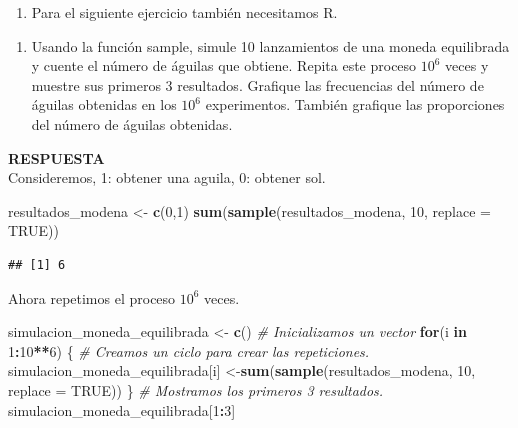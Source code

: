 \documentclass[11pt,]{article}
\newenvironment{Shaded}{\begin{snugshade}}{\end{snugshade}}
\newcommand{\CommentTok}[1]{\textcolor[rgb]{0.56,0.35,0.01}{\textit{#1}}}
\newcommand{\ControlFlowTok}[1]{\textcolor[rgb]{0.13,0.29,0.53}{\textbf{#1}}}
\newcommand{\DataTypeTok}[1]{\textcolor[rgb]{0.13,0.29,0.53}{#1}}
\newcommand{\DecValTok}[1]{\textcolor[rgb]{0.00,0.00,0.81}{#1}}
\newcommand{\KeywordTok}[1]{\textcolor[rgb]{0.13,0.29,0.53}{\textbf{#1}}}
\newcommand{\NormalTok}[1]{#1}
\newcommand{\OperatorTok}[1]{\textcolor[rgb]{0.81,0.36,0.00}{\textbf{#1}}}
\newcommand{\OtherTok}[1]{\textcolor[rgb]{0.56,0.35,0.01}{#1}}
\newcommand{\StringTok}[1]{\textcolor[rgb]{0.31,0.60,0.02}{#1}}
\providecommand{\tightlist}{%
  \setlength{\itemsep}{0pt}\setlength{\parskip}{0pt}}
\newcommand{\res}{\textbf{RESPUESTA}\\}
\begin{document}
\begin{enumerate}
\def\labelenumi{\arabic{enumi}.}
\setcounter{enumi}{4}
\tightlist
\item
  Para el siguiente ejercicio también necesitamos R.
\end{enumerate}

\begin{enumerate}
\def\labelenumi{\alph{enumi}.}
\tightlist
\item
  Usando la función sample, simule 10 lanzamientos de una moneda
  equilibrada y cuente el número de águilas que obtiene. Repita este
  proceso \(10^6\) veces y muestre sus primeros 3 resultados. Grafique
  las frecuencias del número de águilas obtenidas en los \(10^6\)
  experimentos. También grafique las proporciones del número de águilas
  obtenidas.
\end{enumerate}

\res

Consideremos, 1: obtener una aguila, 0: obtener sol.

\begin{Shaded}
\begin{Highlighting}[]
\NormalTok{resultados_modena <-}\StringTok{ }\KeywordTok{c}\NormalTok{(}\DecValTok{0}\NormalTok{,}\DecValTok{1}\NormalTok{)}
\KeywordTok{sum}\NormalTok{(}\KeywordTok{sample}\NormalTok{(resultados_modena, }\DecValTok{10}\NormalTok{, }\DataTypeTok{replace =} \OtherTok{TRUE}\NormalTok{)) }
\end{Highlighting}
\end{Shaded}

\begin{verbatim}
## [1] 6
\end{verbatim}

Ahora repetimos el proceso \(10^6\) veces.

\begin{Shaded}
\begin{Highlighting}[]
\NormalTok{simulacion_moneda_equilibrada <-}\StringTok{ }\KeywordTok{c}\NormalTok{() }\CommentTok{# Inicializamos un vector}
\ControlFlowTok{for}\NormalTok{(i }\ControlFlowTok{in} \DecValTok{1}\OperatorTok{:}\DecValTok{10}\OperatorTok{**}\DecValTok{6}\NormalTok{) \{ }\CommentTok{# Creamos un ciclo para crear las repeticiones.}
\NormalTok{ simulacion_moneda_equilibrada[i] <-}\KeywordTok{sum}\NormalTok{(}\KeywordTok{sample}\NormalTok{(resultados_modena, }\DecValTok{10}\NormalTok{, }\DataTypeTok{replace =} \OtherTok{TRUE}\NormalTok{)) }
\NormalTok{\}}
\CommentTok{# Mostramos los primeros 3 resultados.}
\NormalTok{simulacion_moneda_equilibrada[}\DecValTok{1}\OperatorTok{:}\DecValTok{3}\NormalTok{] }
\end{Highlighting}
\end{Shaded}
\end{document}
